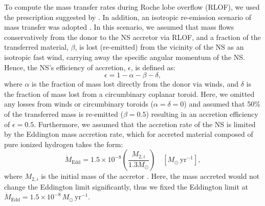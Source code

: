 \documentclass[main.tex]{subfiles}
\begin{document}
    To compute the mass transfer rates during Roche lobe overflow (RLOF), we used the prescription suggested by \cite{Kolb:aap1990}. In addition, an isotropic re-emission scenario of mass transfer was adopted \citep[see][for a review]{Tauris:bk2006}. In this scenario, we assumed that mass flows conservatively from the donor to the NS accretor via RLOF, and a fraction of the transferred material, $\beta$, is lost (re-emitted) from the vicinity of the NS as an isotropic fast wind, carrying away the specific angular momentum of the NS. Hence, the NS's efficiency of accretion, $\epsilon$, is defined as:
    \begin{equation}
        \label{eq:accretion_efficiency}
        \epsilon = 1 - \alpha - \beta - \delta,
    \end{equation}
    where $\alpha$ is the fraction of mass lost directly from the donor via winds, and $\delta$ is the fraction of mass lost from a circumbinary coplanar toroid. Here, we omitted any losses from winds or circumbinary toroids ($\alpha = \delta = 0$) and assumed that 50\% of the transferred mass is re-emitted ($\beta = 0.5$) resulting in an accretion efficiency of $\epsilon = 0.5$.
    Furthermore, we assumed that the accretion rate of the NS is limited by the Eddington mass accretion rate, which for accreted material composed of pure ionized hydrogen takes the form:
    \begin{equation}
        \label{eq:edd_limit}
        \dot{M}_{\text{Edd}} = 1.5 \times 10^{-8} \left(\frac{M_{2,i}}{1.3 M_\odot}\right)\quad[M_\odot\,\text{yr}^{-1}],
    \end{equation}
    where $M_{2,i}$ is the initial mass of the accretor \citep{2020A&A...642A.174M}. Here, the mass accreted would not change the Eddington limit significantly, thus we fixed the Eddington limit at $\dot{M}_{\text{Edd}} = 1.5 \times 10^{-8}\,M_\odot\,\text{yr}^{-1}$.
    
\end{document}
